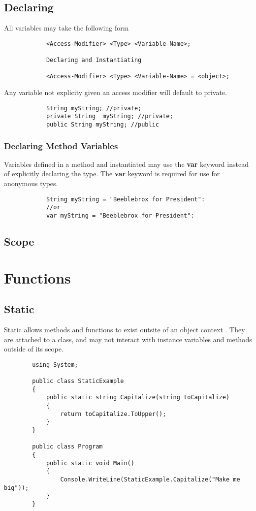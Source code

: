 \documentclass {amsart}
\begin{document}
	\subsection{Declaring}  All variables may take the following form
		\begin{verbatim}
			<Access-Modifier> <Type> <Variable-Name>;

 			Declaring and Instantiating

			<Access-Modifier> <Type> <Variable-Name> = <object>;
		\end{verbatim}
		Any variable not explicity given an access modifier will default to private. 
		\begin{lstlisting}
			String myString; //private;
			private String  myString; //private;
			public String myString; //public
		\end{lstlisting}

	\subsubsection {Declaring Method Variables}
		Variables defined in a method and instantiated may use the {\bf var} keyword instead of explicitly declaring the type.  The {\bf var} keyword is required for use for anonymous types.
		\begin{lstlisting}
			String myString = "Beeblebrox for President":
			//or 
 			var myString = "Beeblebrox for President":
		\end{lstlisting}
		  

	\subsection {Scope}
	
\section{Functions}


	\subsection{Static}  Static allows methods and functions to exist outsite of an object context . They are attached to a class, and may not interact with instance variables and methods outside of its scope.  
		\begin{lstlisting}
		using System;

		public class StaticExample 
		{
			public static string Capitalize(string toCapitalize)
			{
				return toCapitalize.ToUpper();
			}
		}

		public class Program
		{
			public static void Main()
			{
				Console.WriteLine(StaticExample.Capitalize("Make me big"));
			}
		}

		\end{lstlisting}
\end{document}
